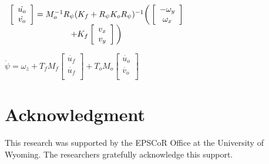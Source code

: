 \documentclass[journal]{IEEEtran}
\begin{document}
$\begin{array}{c c}
\left[
\begin{array}{c}
\dot{u_o}\\
\dot{v_o}\\
\end{array}
\right]
= M_o^{-1}R_{\psi}(K_f + R_{\psi} K_o R_{\psi})^{-1}\bigg(
\left[
\begin{array}{c}
-\omega_y\\
\omega_x\\
\end{array}
\right] &\\
+  K_f
\left[
\begin{array}{c}
v_x\\
v_y\\
\end{array}
\right]\bigg)&
\end{array}$
\vspace{0.4cm}


$\dot{\psi} = \omega_z + T_f M_f 
\left[
\begin{array}{c}
\dot{u_f}\\
\dot{u_f}\\
\end{array}
\right]
+ T_o M_o
\left[
\begin{array}{c}
\dot{u_o}\\
\dot{v_o}\\
\end{array}
\right]$



\section*{Acknowledgment}
This research was supported by the EPSCoR Office at the University of Wyoming. The researchers gratefully acknowledge this support.


\newpage




%
% 
%
%
%

%
%
\end{document}
